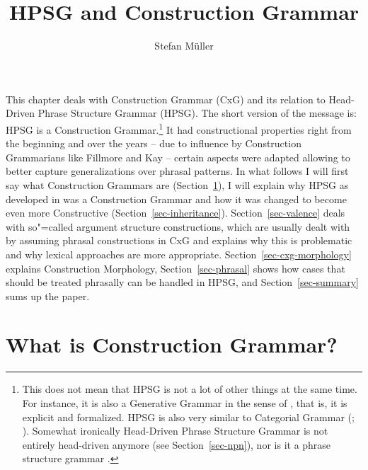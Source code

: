 \documentclass[output=paper]{langsci/langscibook}
\author{Stefan Müller\affiliation{Humboldt-Universität zu Berlin}}
\title{HPSG and Construction Grammar}
\begin{document}
\label{firstpage-cxg}\label{chap-cxg}


\noindent
This chapter deals with Construction Grammar (CxG) and its relation to Head-Driven Phrase Structure
Grammar (HPSG). The short version of the message is: HPSG is a Construction Grammar.\footnote{%
  This does not mean that HPSG is not a lot of other things at the same time. For instance, it is
  also a Generative Grammar in the sense of \citep[]{Chomsky65a}, that is, it is explicit and
  formalized. HPSG is also very similar to Categorial Grammar (\citealt{MuellerUnifying};
  ). Somewhat ironically Head-Driven Phrase Structure Grammar is not entirely
  head-driven anymore (see Section~\ref{sec-npn}), nor is it a phrase structure grammar .
}
It had constructional properties right from the beginning and over the years -- due to influence by
Construction Grammarians like Fillmore and Kay -- certain aspects were adapted allowing to better
capture generalizations over phrasal patterns. In what follows I will first say what Construction
Grammars are (Section~\ref{sec-cxg}), I will explain why HPSG as developed in  was a
Construction Grammar and how it was changed to become even more Constructive
(Section~\ref{sec-inheritance}). Section~\ref{sec-valence} deals with so"=called argument structure
constructions, which are usually dealt with by assuming phrasal constructions in CxG and explains
why this is problematic and why lexical approaches are more appropriate. Section~\ref{sec-cxg-morphology} explains
Construction Morphology, Section~\ref{sec-phrasal} shows how cases that should be treated phrasally
can be handled in HPSG, and Section~\ref{sec-summary} sums up the paper.

\section{What is Construction Grammar?}
\label{sec-cxg}

\end{document}
